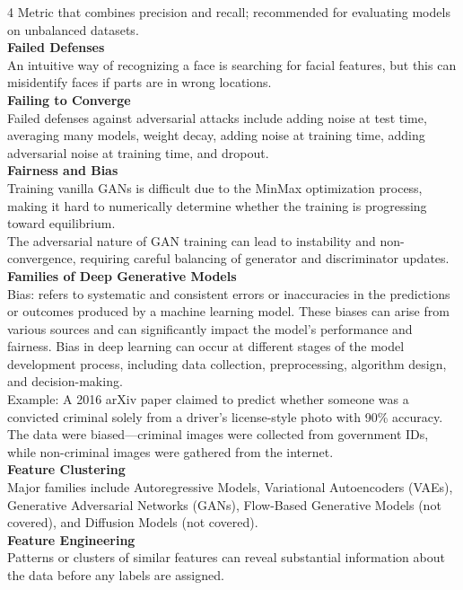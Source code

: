\documentclass[8pt]{extarticle}
\begin{document}
\begin{multicols}{4}
Metric that combines precision and recall; recommended for evaluating models on unbalanced datasets.\\
\vspace{2pt}\textbf{Failed Defenses}\\
An intuitive way of recognizing a face is searching for facial features, but this can misidentify faces if parts are in wrong locations.\\
\vspace{2pt}\textbf{Failing to Converge}\\
Failed defenses against adversarial attacks include adding noise at test time, averaging many models, weight decay, adding noise at training time, adding adversarial noise at training time, and dropout.\\
\vspace{2pt}\textbf{Fairness and Bias}\\
Training vanilla GANs is difficult due to the MinMax optimization process, making it hard to numerically determine whether the training is progressing toward equilibrium.\\
The adversarial nature of GAN training can lead to instability and non-convergence, requiring careful balancing of generator and discriminator updates.\\
\vspace{2pt}\textbf{Families of Deep Generative Models}\\
Bias: refers to systematic and consistent errors or inaccuracies in the predictions or outcomes produced by a machine learning model. These biases can arise from various sources and can significantly impact the model's performance and fairness. Bias in deep learning can occur at different stages of the model development process, including data collection, preprocessing, algorithm design, and decision-making.\\
Example: A 2016 arXiv paper claimed to predict whether someone was a convicted criminal solely from a driver's license-style photo with 90\% accuracy. The data were biased---criminal images were collected from government IDs, while non-criminal images were gathered from the internet.\\
\vspace{2pt}\textbf{Feature Clustering}\\
Major families include Autoregressive Models, Variational Autoencoders (VAEs), Generative Adversarial Networks (GANs), Flow-Based Generative Models (not covered), and Diffusion Models (not covered).\\
\vspace{2pt}\textbf{Feature Engineering}\\
Patterns or clusters of similar features can reveal substantial information about the data before any labels are assigned.\\


\end{multicols}
\end{document}
